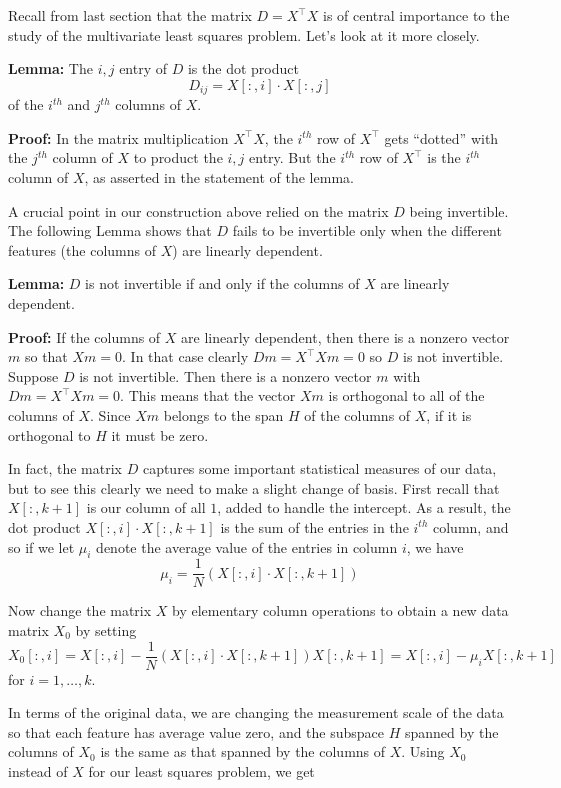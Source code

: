 \documentclass[
]{article}
\begin{document}
Recall from last section that the matrix \(D=X^{\intercal}X\) is of
central importance to the study of the multivariate least squares
problem. Let's look at it more closely.

\textbf{Lemma:} The \(i,j\) entry of \(D\) is the dot product \[
D_{ij}=X[:,i]\cdot X[:,j] \] of the \(i^{th}\) and \(j^{th}\) columns of
\(X\).

\textbf{Proof:} In the matrix multiplication \(X^{\intercal}X\), the
\(i^{th}\) row of \(X^{\intercal}\) gets ``dotted'' with the \(j^{th}\)
column of \(X\) to product the \(i,j\) entry. But the \(i^{th}\) row of
\(X^{\intercal}\) is the \(i^{th}\) column of \(X\), as asserted in the
statement of the lemma.

A crucial point in our construction above relied on the matrix \(D\)
being invertible. The following Lemma shows that \(D\) fails to be
invertible only when the different features (the columns of \(X\)) are
linearly dependent.

\textbf{Lemma:} \(D\) is not invertible if and only if the columns of
\(X\) are linearly dependent.

\textbf{Proof:} If the columns of \(X\) are linearly dependent, then
there is a nonzero vector \(m\) so that \(Xm=0\). In that case clearly
\(Dm=X^{\intercal}Xm=0\) so \(D\) is not invertible. Suppose \(D\) is
not invertible. Then there is a nonzero vector \(m\) with
\(Dm=X^{\intercal}Xm=0\). This means that the vector \(Xm\) is
orthogonal to all of the columns of \(X\). Since \(Xm\) belongs to the
span \(H\) of the columns of \(X\), if it is orthogonal to \(H\) it must
be zero.

In fact, the matrix \(D\) captures some important statistical measures
of our data, but to see this clearly we need to make a slight change of
basis. First recall that \(X[:,k+1]\) is our column of all \(1\), added
to handle the intercept. As a result, the dot product
\(X[:,i]\cdot X[:,k+1]\) is the sum of the entries in the \(i^{th}\)
column, and so if we let \(\mu_{i}\) denote the average value of the
entries in column \(i\), we have \[ \mu_{i} = \frac{1}{N}(X[:,i]\cdot
X[:,k+1]) \]

Now change the matrix \(X\) by elementary column operations to obtain a
new data matrix \(X_{0}\) by setting \[ X_{0}[:,i] =
X[:,i]-\frac{1}{N}(X[:,i]\cdot X[:,k+1])X[:,k+1] =
X[:,i]-\mu_{i}X[:,k+1] \] for \(i=1,\ldots, k\).

In terms of the original data, we are changing the measurement scale of
the data so that each feature has average value zero, and the subspace
\(H\) spanned by the columns of \(X_{0}\) is the same as that spanned by
the columns of \(X\). Using \(X_{0}\) instead of \(X\) for our least
squares problem, we get
\end{document}

